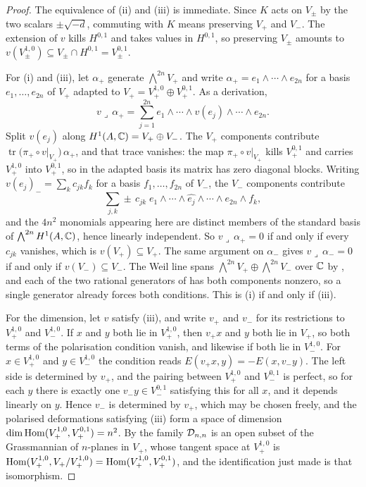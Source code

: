 \begin{proof}
The equivalence of (ii) and (iii) is immediate. Since $K$ acts on $V_{\pm}$
by the two scalars $\pm\sqrt{-d}$, commuting with $K$ means preserving $V_{+}$
and $V_{-}$. The extension of $v$ kills $H^{0,1}$ and takes values in
$H^{0,1}$, so preserving $V_{\pm}$ amounts to
$v(V_{\pm}^{1,0})\subseteq V_{\pm}\cap H^{0,1}=V_{\pm}^{0,1}$.

For (i) and (iii), let $\alpha_{+}$ generate $\bigwedge^{2n}V_{+}$ and write
$\alpha_{+}=e_{1}\wedge\cdots\wedge e_{2n}$ for a basis $e_{1},\dots,e_{2n}$
of $V_{+}$ adapted to $V_{+}=V_{+}^{1,0}\oplus V_{+}^{0,1}$. As a derivation,
\[
  v\lrcorner\,\alpha_{+}
  =\sum_{j=1}^{2n}e_{1}\wedge\cdots\wedge v(e_{j})\wedge\cdots\wedge e_{2n}.
\]
Split $v(e_{j})$ along $H^{1}(A,\mathbb{C})=V_{+}\oplus V_{-}$. The $V_{+}$
components contribute
$\operatorname{tr}\bigl(\pi_{+}\circ v|_{V_{+}}\bigr)\,\alpha_{+}$, and that
trace vanishes: the map $\pi_{+}\circ v|_{V_{+}}$ kills $V_{+}^{0,1}$ and
carries $V_{+}^{1,0}$ into $V_{+}^{0,1}$, so in the adapted basis its matrix
has zero diagonal blocks. Writing
$v(e_{j})_{-}=\sum_{k}c_{jk}f_{k}$ for a basis $f_{1},\dots,f_{2n}$ of
$V_{-}$, the $V_{-}$ components contribute
\[
  \sum_{j,k}\pm\,c_{jk}\;
  e_{1}\wedge\cdots\wedge\widehat{e_{j}}\wedge\cdots\wedge e_{2n}\wedge f_{k},
\]
and the $4n^{2}$ monomials appearing here are distinct members of the
standard basis of $\bigwedge^{2n}H^{1}(A,\mathbb{C})$, hence linearly independent.
So $v\lrcorner\,\alpha_{+}=0$ if and only if every $c_{jk}$ vanishes, which is
$v(V_{+})\subseteq V_{+}$. The same argument on $\alpha_{-}$ gives
$v\lrcorner\,\alpha_{-}=0$ if and only if $v(V_{-})\subseteq V_{-}$. The Weil
line spans $\bigwedge^{2n}V_{+}\oplus\bigwedge^{2n}V_{-}$ over $\mathbb{C}$ by
, and each of the two rational generators of
 has both components nonzero, so a single generator
already forces both conditions. This is (i) if and only if (iii).

For the dimension, let $v$ satisfy (iii), and write $v_{+}$ and $v_{-}$ for
its restrictions to $V_{+}^{1,0}$ and $V_{-}^{1,0}$. If $x$ and $y$ both lie
in $V_{+}^{1,0}$, then $v_{+}x$ and $y$ both lie in $V_{+}$, so both terms of
the polarisation condition vanish, and likewise if both lie in $V_{-}^{1,0}$.
For $x\in V_{+}^{1,0}$ and $y\in V_{-}^{1,0}$ the condition reads
$E(v_{+}x,y)=-E(x,v_{-}y)$. The left side is determined by $v_{+}$, and the
pairing between $V_{+}^{1,0}$ and $V_{-}^{0,1}$ is perfect, so for each $y$
there is exactly one $v_{-}y\in V_{-}^{0,1}$ satisfying this for all $x$, and
it depends linearly on $y$. Hence $v_{-}$ is determined by $v_{+}$, which may
be chosen freely, and the polarised deformations satisfying (iii) form a
space of dimension $\dim\operatorname{Hom}(V_{+}^{1,0},V_{+}^{0,1})=n^{2}$. By
 the family $\mathcal{D}_{n,n}$ is an open subset of the
Grassmannian of $n$-planes in $V_{+}$, whose tangent space at
$V_{+}^{1,0}$ is $\operatorname{Hom}(V_{+}^{1,0},V_{+}/V_{+}^{1,0})=\operatorname{Hom}(V_{+}^{1,0},V_{+}^{0,1})$,
and the identification just made is that isomorphism.
\end{proof}

